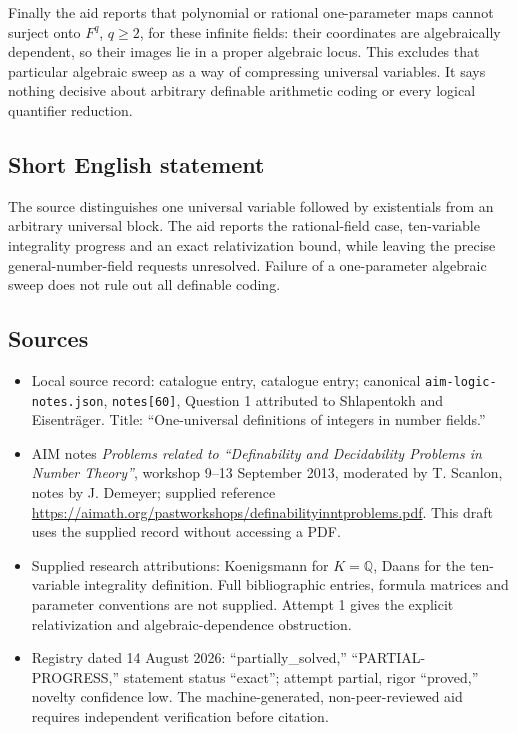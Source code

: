 \documentclass[11pt]{article}
\begin{document}
Finally the aid reports that polynomial or rational one-parameter maps cannot surject onto \(F^q\), \(q\geq2\), for these infinite fields: their coordinates are algebraically dependent, so their images lie in a proper algebraic locus. This excludes that particular algebraic sweep as a way of compressing universal variables. It says nothing decisive about arbitrary definable arithmetic coding or every logical quantifier reduction.
\subsection{Short English statement}
The source distinguishes one universal variable followed by existentials from an arbitrary universal block. The aid reports the rational-field case, ten-variable integrality progress and an exact relativization bound, while leaving the precise general-number-field requests unresolved. Failure of a one-parameter algebraic sweep does not rule out all definable coding.
\subsection{Sources}
\begin{itemize}
\item Local source record: catalogue entry, catalogue entry; canonical \texttt{aim-logic-notes.json}, \texttt{notes[60]}, Question 1 attributed to Shlapentokh and Eisentr\"ager. Title: ``One-universal definitions of integers in number fields.''
\item AIM notes \emph{Problems related to ``Definability and Decidability Problems in Number Theory''}, workshop 9--13 September 2013, moderated by T. Scanlon, notes by J. Demeyer; supplied reference \url{https://aimath.org/pastworkshops/definabilityinntproblems.pdf}. This draft uses the supplied record without accessing a PDF.
\item Supplied research attributions: Koenigsmann for \(K=\mathbb Q\), Daans for the ten-variable integrality definition. Full bibliographic entries, formula matrices and parameter conventions are not supplied. Attempt 1 gives the explicit relativization and algebraic-dependence obstruction.
\item Registry dated 14 August 2026: ``partially\_solved,'' ``PARTIAL-PROGRESS,'' statement status ``exact''; attempt partial, rigor ``proved,'' novelty confidence low. The machine-generated, non-peer-reviewed aid requires independent verification before citation.
\end{itemize}
\end{document}
